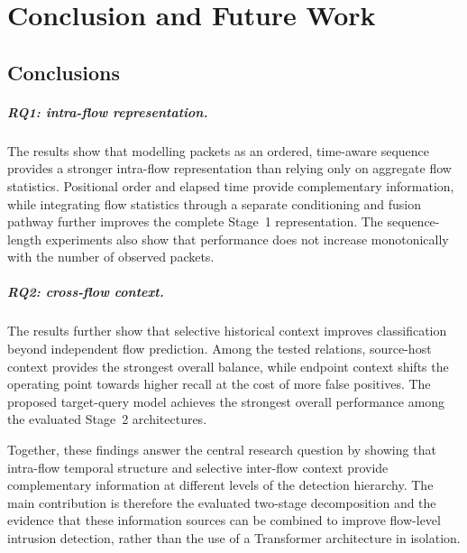 \documentclass[11pt,fleqn]{report}
\begin{document}


\chapter{Conclusion and Future Work}
\label{sec:conclusion_future_work}

\section{Conclusions}
\label{subsec:conclusion_rq_answers}

\paragraph{RQ1: intra-flow representation.}
The results show that modelling packets as an ordered, time-aware sequence provides a stronger intra-flow representation than relying only on aggregate flow statistics. Positional order and elapsed time provide complementary information, while integrating flow statistics through a separate conditioning and fusion pathway further improves the complete Stage~1 representation. The sequence-length experiments also show that performance does not increase monotonically with the number of observed packets.

\paragraph{RQ2: cross-flow context.}
The results further show that selective historical context improves classification beyond independent flow prediction. Among the tested relations, source-host context provides the strongest overall balance, while endpoint context shifts the operating point towards higher recall at the cost of more false positives. The proposed target-query model achieves the strongest overall performance among the evaluated Stage~2 architectures.

Together, these findings answer the central research question by showing that intra-flow temporal structure and selective inter-flow context provide complementary information at different levels of the detection hierarchy. The main contribution is therefore the evaluated two-stage decomposition and the evidence that these information sources can be combined to improve flow-level intrusion detection, rather than the use of a Transformer architecture in isolation.
\end{document}
